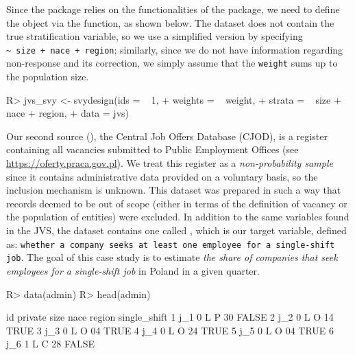 \documentclass[
]{jss}
\begin{document}
Since the  package relies on the functionalities of the
 package, we need to define the  object via
the  function, as shown below. The dataset does not
contain the true stratification variable, so we use a simplified version
by specifying \texttt{\textasciitilde{}\ size\ +\ nace\ +\ region};
similarly, since we do not have information regarding non-response and
its correction, we simply assume that the \texttt{weight} sums up to the
population size.

\begin{CodeChunk}
\begin{CodeInput}
R> jvs_svy <- svydesign(ids = ~ 1, 
+                      weights = ~ weight,
+                      strata = ~ size + nace + region,
+                      data = jvs)
\end{CodeInput}
\end{CodeChunk}

Our second source (), the Central Job Offers Database
(CJOD), is a register containing all vacancies submitted to Public
Employment Offices (see \url{https://oferty.praca.gov.pl}). We treat
this register as a \textit{non-probability sample} since it contains
administrative data provided on a voluntary basis, so the inclusion
mechanism is unknown. This dataset was prepared in such a way that
records deemed to be out of scope (either in terms of the definition of
vacancy or the population of entities) were excluded. In addition to the
same variables found in the JVS, the dataset contains one called
, which is our target variable, defined as:
\texttt{whether a company seeks at least one employee for a single-shift job}.
The goal of this case study is to estimate
\textit{the share of companies that seek employees for a single-shift job}
in Poland in a given quarter.

\begin{CodeChunk}
\begin{CodeInput}
R> data(admin)
R> head(admin)
\end{CodeInput}
\begin{CodeOutput}
   id private size nace region single_shift
1 j_1       0    L    P     30        FALSE
2 j_2       0    L    O     14         TRUE
3 j_3       0    L    O     04         TRUE
4 j_4       0    L    O     24         TRUE
5 j_5       0    L    O     04         TRUE
6 j_6       1    L    C     28        FALSE
\end{CodeOutput}
\end{CodeChunk}
\end{document}
